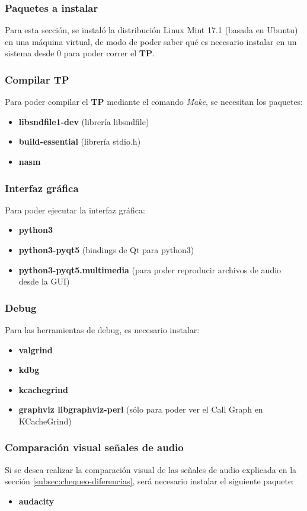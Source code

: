 \subsubsection{Paquetes a instalar}
\label{subsec:instalar}
Para esta sección, se instaló la distribución Linux Mint 17.1 (basada en Ubuntu) en una máquina virtual, de modo de poder saber qué es necesario instalar en un sistema desde 0 para poder correr el \textbf{TP}.

\subsubsection*{Compilar TP}
Para poder compilar el \textbf{TP} mediante el comando \textit{Make}, se necesitan los paquetes: 
\begin{itemize}
 \item \textbf{libsndfile1-dev} (librería libsndfile)
 \item \textbf{build-essential} (librería stdio.h)
 \item \textbf{nasm}
\end{itemize}

\subsubsection*{Interfaz gráfica}
Para poder ejecutar la interfaz gráfica:
\begin{itemize}
 \item \textbf{python3}
 \item \textbf{python3-pyqt5} (bindings de Qt para python3)
 \item \textbf{python3-pyqt5.multimedia} (para poder reproducir archivos de audio desde la GUI)
\end{itemize}

\subsubsection*{Debug}
Para las herramientas de debug, es necesario instalar:
\begin{itemize}
 \item \textbf{valgrind}
 \item \textbf{kdbg}
 \item \textbf{kcachegrind}
 \item \textbf{graphviz libgraphviz-perl} (sólo para poder ver el Call Graph en KCacheGrind)
\end{itemize}

\subsubsection*{Comparación visual señales de audio}
Si se desea realizar la comparación visual de las señales de audio explicada en la sección \ref{subsec:chequeo-diferencias}, será necesario instalar el siguiente paquete:
\begin{itemize}
 \item \textbf{audacity}
\end{itemize}
